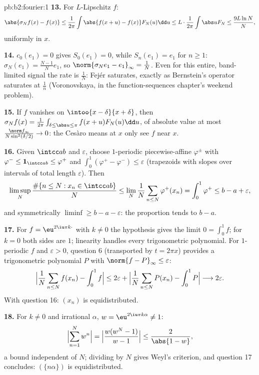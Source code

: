 \begin{solution}{pb:b2:fourier:1}
\textbf{13.} For $L$-Lipschitz $f$:
\[
\abs{\sigma_Nf(x) - f(x)}
\leq \frac{1}{2\pi}\int\abs{f(x+u) - f(x)}F_N(u)\dd u
\leq L\cdot\frac{1}{2\pi}\int\abs uF_N
\leq \frac{9L\ln N}{N},
\]
uniformly in $x$.

\textbf{14.} $c_0(e_1) = 0$ gives $S_0(e_1) = 0$, while
$S_n(e_1) = e_1$ for $n \geq 1$: $\sigma_N(e_1) =
\frac{N-1}{N}e_1$, so $\norm{\sigma_Ne_1 - e_1}_\infty =
\frac1N$. Even for this entire, band-limited signal the rate is
$\frac1N$: Fej\'er saturates, exactly as Bernstein's operator
saturates at $\frac1n$ (Voronovskaya, in the
function-sequences chapter's weekend problem).

\textbf{15.} If $f$ vanishes on $\intoo{x-\delta}{x+\delta}$,
then $\sigma_Nf(x) = \frac{1}{2\pi}\int_{\delta \leq \abs u
\leq \pi}f(x+u)F_N(u)\dd u$, of absolute value at most
$\frac{\norm f_\infty}{N\sin^2(\delta/2)} \to 0$: the Ces\`aro
means at $x$ only see $f$ near $x$.

\textbf{16.} Given $\intcc ab$ and $\varepsilon$, choose
 $1$-periodic piecewise-affine $\varphi^\pm$ with
$\varphi^- \leq \mathbf 1_{\intcc ab} \leq \varphi^+$ and
$\int_0^1(\varphi^+ - \varphi^-) \leq \varepsilon$ (trapezoids
with slopes over intervals of total length $\varepsilon$).
Then
\[
\limsup_N\frac{\#\{n \leq N : x_n \in \intcc ab\}}{N}
\leq \lim_N\frac1N\sum_{n\leq N}\varphi^+(x_n)
= \int_0^1\varphi^+ \leq b - a + \varepsilon ,
\]
and symmetrically $\liminf \geq b - a - \varepsilon$: the
proportion tends to $b - a$.

\textbf{17.} For $f = \eu^{2\iu\pi k\cdot}$ with $k \neq 0$ the
hypothesis gives the limit $0 = \int_0^1f$; for $k = 0$ both
sides are $1$; linearity handles every trigonometric
polynomial. For  $1$-periodic $f$ and $\varepsilon >
0$, question 6 (transported by $t = 2\pi x$) provides a
trigonometric polynomial $P$ with $\norm{f - P}_\infty \leq
\varepsilon$:
\[
\Bigl|\frac1N\sum_{n\leq N}f(x_n) - \int_0^1f\Bigr|
\leq 2\varepsilon +
\Bigl|\frac1N\sum_{n\leq N}P(x_n) - \int_0^1P\Bigr|
\longrightarrow 2\varepsilon .
\]
With question 16: $(x_n)$ is equidistributed.

\textbf{18.} For $k \neq 0$ and irrational $\alpha$, $w =
\eu^{2\iu\pi k\alpha} \neq 1$:
\[
\Bigl|\sum_{n=1}^{N}w^n\Bigr|
= \Bigl|\frac{w(w^N - 1)}{w - 1}\Bigr|
\leq \frac{2}{\abs{1 - w}} ,
\]
a bound independent of $N$; dividing by $N$ gives Weyl's
criterion, and question 17 concludes: $(\{n\alpha\})$ is
equidistributed.


\end{solution}
